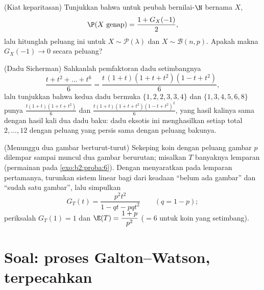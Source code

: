 \begin{exercise}[$\star$]\label{exo:b2:genfun:10}
(Kiat keparitasan) Tunjukkan bahwa untuk peubah bernilai-$\N$ bernama $X$,
\[
\P(X \text{ genap}) = \frac{1 + G_X(-1)}{2} ,
\]
lalu hitunglah peluang ini untuk $X \sim \mathcal P(\lambda)$
dan $X \sim \mathcal B(n, p)$. Apakah makna $G_X(-1) \to 0$
secara peluang?
\end{exercise}

\begin{exercise}[$\star\star$]\label{exo:b2:genfun:11}
(Dadu Sicherman) Sahkanlah pemfaktoran 
dadu setimbangnya
\[
\frac{t + t^2 + \dots + t^6}{6}
= \frac{t\,(1 + t)(1 + t + t^2)(1 - t + t^2)}{6},
\]
lalu tunjukkan bahwa kedua dadu bermuka $\{1, 2, 2, 3, 3, 4\}$
dan $\{1, 3, 4, 5, 6, 8\}$ punya 
$\frac{t(1+t)(1+t+t^2)}6$ dan
$\frac{t(1+t)(1+t+t^2)(1-t+t^2)^2}6$, yang hasil kalinya sama dengan hasil kali
dua dadu baku: dadu eksotis ini menghasilkan setiap total $2,
\dots, 12$ dengan peluang yang persis sama dengan peluang bakunya.
\end{exercise}

\begin{exercise}[$\star\star\star$]\label{exo:b2:genfun:12}
(Menunggu dua gambar berturut-turut) Sekeping koin dengan peluang gambar
$p$ dilempar sampai muncul dua gambar berurutan; misalkan $T$
banyaknya lemparan (permainan pada \cref{exo:b2:proba:6}).
Dengan menyaratkan pada lemparan pertamanya, turunkan sistem linear bagi
 dari keadaan ``belum ada gambar''
dan ``sudah satu gambar'', lalu simpulkan
\[
G_T(t) = \frac{p^2t^2}{1 - qt - pqt^2}
\qquad (q = 1 - p);
\]
periksalah $G_T(1) = 1$ dan $\E(T) = \dfrac{1 + p}{p^2}$ ($= 6$
untuk koin yang setimbang).
\end{exercise}

\section{Soal: proses Galton--Watson, terpecahkan}

